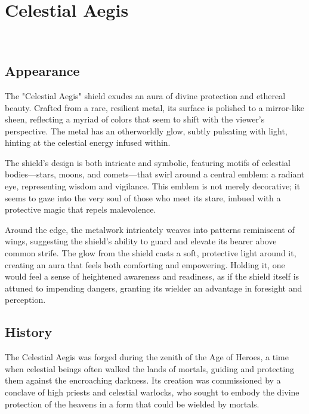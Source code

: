 
\chapter*{Celestial Aegis}
\\

\section*{Appearance}
The "Celestial Aegis" shield exudes an aura of divine protection and ethereal beauty. Crafted from a rare, resilient metal, its surface is polished to a mirror-like sheen, reflecting a myriad of colors that seem to shift with the viewer's perspective. The metal has an otherworldly glow, subtly pulsating with light, hinting at the celestial energy infused within.

The shield's design is both intricate and symbolic, featuring motifs of celestial bodies—stars, moons, and comets—that swirl around a central emblem: a radiant eye, representing wisdom and vigilance. This emblem is not merely decorative; it seems to gaze into the very soul of those who meet its stare, imbued with a protective magic that repels malevolence.

Around the edge, the metalwork intricately weaves into patterns reminiscent of wings, suggesting the shield's ability to guard and elevate its bearer above common strife. The glow from the shield casts a soft, protective light around it, creating an aura that feels both comforting and empowering. Holding it, one would feel a sense of heightened awareness and readiness, as if the shield itself is attuned to impending dangers, granting its wielder an advantage in foresight and perception.

\section*{History}
The Celestial Aegis was forged during the zenith of the Age of Heroes, a time when celestial beings often walked the lands of mortals, guiding and protecting them against the encroaching darkness. Its creation was commissioned by a conclave of high priests and celestial warlocks, who sought to embody the divine protection of the heavens in a form that could be wielded by mortals.

